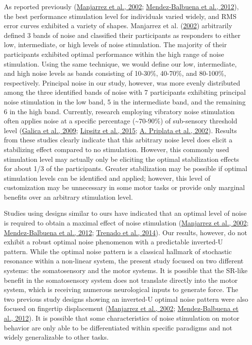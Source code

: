 \documentclass[]{cik}%
\begin{document}
As reported previously (\protect\hyperlink{ref-Manjarrez2002}{Manjarrez
et al., 2002};
\protect\hyperlink{ref-Mendez-Balbuena2012}{Mendez-Balbuena et al.,
2012}), the best performance stimulation level for individuals varied
widely, and RMS error curves exhibited a variety of shapes. Manjarrez et
al. (\protect\hyperlink{ref-Manjarrez2002}{2002}) arbitrarily defined 3
bands of noise and classified their participants as responders to either
low, intermediate, or high levels of noise stimulation. The majority of
their participants exhibited optimal performance within the high range
of noise stimulation. Using the same technique, we would define our low,
intermediate, and high noise levels as bands consisting of 10-30\%,
40-70\%, and 80-100\%, respectively. Principal noise in our study,
however, was more evenly distributed among the three identified bands of
noise with 7 participants exhibiting principal noise stimulation in the
low band, 5 in the intermediate band, and the remaining 6 in the high
band. Currently, research employing vibratory noise stimulation often
applies noise at a specific percentage (\textasciitilde70-90\%) of
sub-sensory threshold level (\protect\hyperlink{ref-Galica2009}{Galica
et al., 2009}; \protect\hyperlink{ref-Lipsitz2015}{Lipsitz et al.,
2015}; \protect\hyperlink{ref-Priplata2002}{A. Priplata et al., 2002}).
Results from these studies clearly indicate that this arbitrary noise
level does elicit a stabilizing effect compared to no stimulation.
However, this commonly used stimulation level may actually only be
eliciting the optimal stabilization effects for about 1/3 of the
participants. Greater stabilization may be possible if optimal
stimulation levels can be identified and applied; however, this level of
customization may be unnecessary in some motor tasks or provide only
marginal benefits over an arbitrary stimulation level.

Studies using designs similar to ours have indicated that an optimal
level of noise is required to obtain a maximal effect of noise
stimulation (\protect\hyperlink{ref-Manjarrez2002}{Manjarrez et al.,
2002}; \protect\hyperlink{ref-Mendez-Balbuena2012}{Mendez-Balbuena et
al., 2012}; \protect\hyperlink{ref-Trenado2014}{Trenado et al., 2014}).
Our results, however, do not exhibit a robust optimal noise phenomenon
with a predictable inverted-U pattern. While the optimal noise pattern
is a classical hallmark of stochastic resonance within a non-linear
system, the present study focused on two different systems: the
somatosensory and the motor systems. It is possible that the SR-like
benefit in the somatosensory system does not translate directly into the
motor system, which is receiving numerous neurological inputs to
generate force. The two previous study designs showing an inverted-U
optimal noise pattern were also focused on fingertip displacement
(\protect\hyperlink{ref-Manjarrez2002}{Manjarrez et al., 2002};
\protect\hyperlink{ref-Mendez-Balbuena2012}{Mendez-Balbuena et al.,
2012}). It is possible that some characteristics of noise stimulation on
motor behavior are only able to be differentiated within specific
paradigms and not widely generalizable to other tasks.
\end{document}
